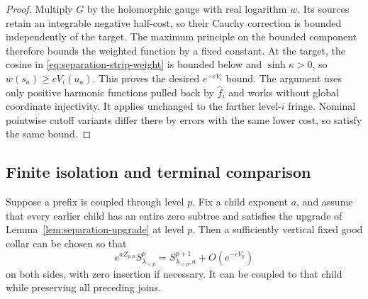 \begin{proof}
Multiply $G$ by the holomorphic gauge with real logarithm $w$.
Its sources retain an integrable negative half-cost, so their
Cauchy correction is bounded independently of the target.
The maximum principle on the bounded component therefore
bounds the weighted function by a fixed constant.  At the
target, the cosine in \eqref{eq:separation-strip-weight} is
bounded below and $\sinh\kappa>0$, so
$w(s_a)\geq cV_i(u_a)$.  This proves the desired
$e^{-cV_i}$ bound.  The argument uses only positive harmonic
functions pulled back by $\widehat f_i$ and works without
global coordinate injectivity.  It applies unchanged to the
farther level-$i$ fringe.  Nominal pointwise cutoff variants
differ there by errors with the same lower cost, so satisfy
the same bound.
\end{proof}

\subsection{Finite isolation and terminal comparison}



\begin{lemma}\label{lem:separation-isolate}
Suppose a prefix is coupled through level $p$.  Fix a child
exponent $a$, and assume that every earlier child has an entire
zero subtree and satisfies the upgrade of
Lemma~\ref{lem:separation-upgrade} at level $p$.
Then a sufficiently vertical fixed good collar can be chosen so
that
\begin{equation}\label{eq:separation-isolate}
 e^{aZ_{p,p}}S^p_{\lambda_{<p}}
     =S^{p+1}_{\lambda_{<p},a}+O(e^{-cV_p})
\end{equation}
on both sides, with zero insertion if necessary.  It can be
coupled to that child while preserving all preceding joins.
\end{lemma}

